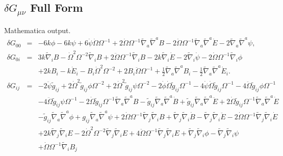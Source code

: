 \documentclass[10pt,letterpaper]{article}
\numberwithin{equation}{section}
\begin{document}
\begin{appendices}
\section{$\delta G_{\mu\nu}$ Full Form}
Mathematica output.
\begin{eqnarray}
\delta  G_{00}&=&-6 k \phi
 - 6 k \psi
 + 6 \dot{\psi} \dot{\Omega} \Omega^{-1}
 + 2 \dot{\Omega} \Omega^{-1} \tilde\nabla_{a}\tilde\nabla^{a}B
 - 2 \dot{\Omega} \Omega^{-1} \tilde\nabla_{a}\tilde\nabla^{a}\dot{E}
 - 2 \tilde\nabla_{a}\tilde\nabla^{a}\psi,
\nonumber\\
\delta  G_{0i}&=&3 k \tilde\nabla_{i}B
 -  \dot{\Omega}^2 \Omega^{-2} \tilde\nabla_{i}B
 + 2 \ddot{\Omega} \Omega^{-1} \tilde\nabla_{i}B
 - 2 k \tilde\nabla_{i}\dot{E}
 - 2 \tilde\nabla_{i}\dot{\psi}
 - 2 \dot{\Omega} \Omega^{-1} \tilde\nabla_{i}\phi
\nonumber\\
&&+2 k B_{i}
 -  k \dot{E}_{i}
 -  B_{i} \dot{\Omega}^2 \Omega^{-2}
 + 2 B_{i} \ddot{\Omega} \Omega^{-1}
 + \tfrac{1}{2} \tilde\nabla_{a}\tilde\nabla^{a}B_{i}
 -  \tfrac{1}{2} \tilde\nabla_{a}\tilde\nabla^{a}\dot{E}_{i}.
\nonumber\\
\delta G_{ij}&=&-2 \ddot{\psi} \tilde g_{ij}
 + 2 \dot{\Omega}^2 \tilde g_{ij} \phi \Omega^{-2}
 + 2 \dot{\Omega}^2 \tilde g_{ij} \psi \Omega^{-2}
 - 2 \dot{\phi} \dot{\Omega} \tilde g_{ij} \Omega^{-1}
 - 4 \dot{\psi} \dot{\Omega} \tilde g_{ij} \Omega^{-1}
 - 4 \ddot{\Omega} \tilde g_{ij} \phi \Omega^{-1}\nonumber\\
&& - 4 \ddot{\Omega} \tilde g_{ij} \psi \Omega^{-1}
 - 2 \dot{\Omega} \tilde g_{ij} \Omega^{-1} \tilde\nabla_{a}\tilde\nabla^{a}B
 -  \tilde g_{ij} \tilde\nabla_{a}\tilde\nabla^{a}\dot{B}
 + \tilde g_{ij} \tilde\nabla_{a}\tilde\nabla^{a}\ddot{E}
 + 2 \dot{\Omega} \tilde g_{ij} \Omega^{-1} \tilde\nabla_{a}\tilde\nabla^{a}\dot{E}\nonumber\\
&& -  \tilde g_{ij} \tilde\nabla_{a}\tilde\nabla^{a}\phi
 + g_{ij} \tilde\nabla_{a}\tilde\nabla^{a}\psi
 + 2 \dot{\Omega} \Omega^{-1} \tilde\nabla_{j}\tilde\nabla_{i}B
 + \tilde\nabla_{j}\tilde\nabla_{i}\dot{B}
 -  \tilde\nabla_{j}\tilde\nabla_{i}\ddot{E}
 - 2 \dot{\Omega} \Omega^{-1} \tilde\nabla_{j}\tilde\nabla_{i}\dot{E}\nonumber\\
&& + 2 k \tilde\nabla_{j}\tilde\nabla_{i}E
 - 2 \dot{\Omega}^2 \Omega^{-2} \tilde\nabla_{j}\tilde\nabla_{i}E
 + 4 \ddot{\Omega} \Omega^{-1} \tilde\nabla_{j}\tilde\nabla_{i}E
 + \tilde\nabla_{j}\tilde\nabla_{i}\phi
 -  \tilde\nabla_{j}\tilde\nabla_{i}\psi
\nonumber\\
&& +\dot{\Omega} \Omega^{-1} \tilde\nabla_{i}B_{j}

\end{eqnarray}
\end{appendices}
\end{document}
